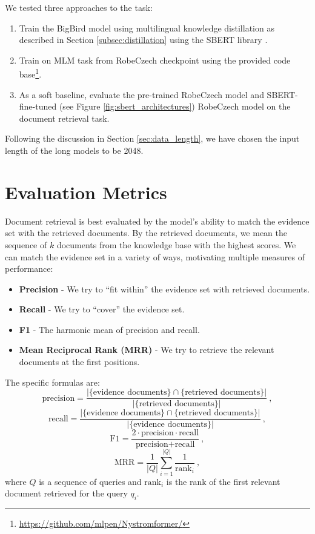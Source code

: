 We tested three approaches to the task:

\begin{enumerate}
    \item Train the BigBird model using multilingual knowledge distillation as described in Section \ref{subsec:distillation} using the SBERT library \citep{sbert}.
    \item Train \nystr{} on MLM task from RobeCzech \citep{robeczech} checkpoint using the provided code base\footnote{\url{https://github.com/mlpen/Nystromformer/}}.
    \item As a soft baseline, evaluate the pre-trained RobeCzech model and SBERT-fine-tuned (see Figure \ref{fig:sbert_architectures}) RobeCzech model on the document retrieval task.  
\end{enumerate}

Following the discussion in Section \ref{sec:data_length}, we have chosen the input length of the long models to be 2048. 

\section{Evaluation Metrics}

Document retrieval is best evaluated by the model's ability to match the evidence set with the retrieved documents.
By the retrieved documents, we mean the sequence of $k$ documents from the knowledge base with the highest scores.
We can match the evidence set in a variety of ways, motivating multiple measures of performance:
\begin{itemize}
    \item \textbf{Precision} - We try to ``fit within'' the evidence set with retrieved documents.
    \item \textbf{Recall} - We try to ``cover'' the evidence set.
    \item \textbf{F1} - The harmonic mean of precision and recall. 
    \item \textbf{Mean Reciprocal Rank (MRR)} \citep{mrr} - We try to retrieve the relevant documents at the first positions. 
\end{itemize}
The specific formulas are: 
\begin{equation}
    \text{precision} = \frac{|\{\text{evidence documents}\}\cap\{\text{retrieved documents}\}|}{|\{\text{retrieved documents}\}|}\ ,
\end{equation}
\begin{equation}
    \text{recall} = \frac{|\{\text{evidence documents}\}\cap\{\text{retrieved documents}\}|}{|\{\text{evidence documents}\}|}\ ,
\end{equation}
\begin{equation}
    \text{F1} = 
    \frac{2\cdot\text{precision}\cdot\text{recall}}{\text{precision}+\text{recall}}\ ,
\end{equation}
\begin{equation}
    \text{MRR} = \frac{1}{|Q|}\sum_{i=1}^{|Q|}{\frac{1}{\text{rank}_i}}\ ,
\end{equation}
where $Q$ is a sequence of queries and $\text{rank}_i$ is the rank of the first relevant document retrieved for the query $q_i$.


